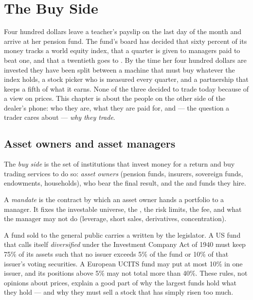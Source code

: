 \chapter{The Buy Side}\label{ch:m1:the-buy-side}

Four hundred dollars leave a teacher's payslip on the last day of the month
and arrive at her pension fund. The fund's board has decided that sixty
percent of its money tracks a world equity index, that a quarter is given to
managers paid to beat one, and that a twentieth goes to . By the
time her four hundred dollars are invested they have been split between a
machine that must buy whatever the index holds, a stock picker who is
measured every quarter, and a partnership that keeps a fifth of what it
earns. None of the three decided to trade today because of a view on prices.
This chapter is about the people on the other side of the dealer's phone:
who they are, what they are paid for, and --- the question a trader cares
about --- \emph{why they trade}.

\section{Asset owners and asset managers}

\begin{definition}\label{def:m1:the-buy-side:buy-side}
The \emph{buy side} is the set of institutions that invest
money for a return and buy trading services to do so: \emph{asset owners}
(pension funds, insurers, sovereign funds, endowments, households), who bear
the final result, and the \emph{} and funds they hire.
\end{definition}

\begin{definition}[Mandate]\label{def:m1:the-buy-side:mandate}
A \emph{mandate} is the contract by which an asset owner
hands a portfolio to a manager. It fixes the investable universe, the
, the risk limits, the fee, and what the manager may not do
(leverage, short sales, derivatives, concentration).
\end{definition}

\begin{remark}\label{rem:m1:the-buy-side:law}
A fund sold to the general public carries a  written by the
legislator. A US fund that calls itself \emph{diversified} under the
Investment Company Act of 1940 must keep 75\% of its assets such that no
issuer exceeds 5\% of the fund or 10\% of that issuer's voting securities. A
European UCITS fund may put at most 10\% in one issuer, and its positions
above 5\% may not total more than 40\%. These rules, not opinions about
prices, explain a good part of why the largest funds hold what they hold ---
and why they must sell a stock that has simply risen too much.
\end{remark}

